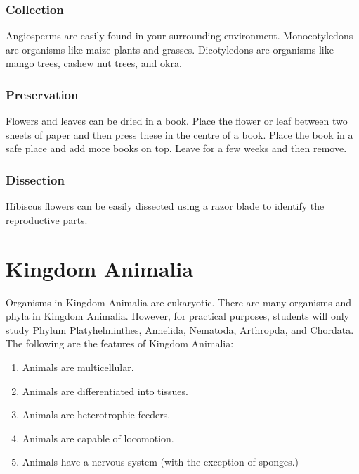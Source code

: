 \subsubsection{Collection}
Angiosperms are easily found in your surrounding environment. Monocotyledons are organisms like maize plants and grasses. Dicotyledons are organisms like mango trees, cashew nut trees, and okra.

\subsubsection{Preservation} 
Flowers and leaves can be dried in a book. Place the flower or leaf between two sheets of paper and then press these in the centre of a book. Place the book in a safe place and add more books on top. Leave for a few weeks and then remove.

\subsubsection{Dissection}
Hibiscus flowers can be easily dissected using a razor blade to identify the reproductive parts.

\section{Kingdom Animalia}
Organisms in Kingdom Animalia are eukaryotic. There are many organisms and phyla in Kingdom Animalia. However, for practical purposes, students will only study Phylum Platyhelminthes, Annelida, Nematoda, Arthropda, and Chordata.\\
The following are the features of Kingdom Animalia:
\begin{enumerate}
\item{Animals are multicellular.}
\item{Animals are differentiated into tissues.}
\item{Animals are heterotrophic feeders.}
\item{Animals are capable of locomotion.}
\item{Animals have a nervous system (with the exception of sponges.)}
\end{enumerate}

